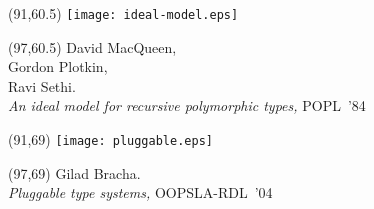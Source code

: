 \documentclass[a0]{a0poster}
\def\FONTSIZE#1{\fontsize{#1}{#1}\selectfont}
\def\CITE{\FONTSIZE{30}}
\begin{document}
\begin{textblock}{20}(91,60.5)
\texttt{[image: ideal-model.eps]}
\end{textblock}
\begin{textblock}{14}(97,60.5)
\CITE
David MacQueen,\\
Gordon Plotkin,\\
Ravi Sethi.\\
\emph{An ideal model for recursive polymorphic types,} POPL~'84
\end{textblock}

\begin{textblock}{20}(91,69)
\texttt{[image: pluggable.eps]}
\end{textblock}
\begin{textblock}{14}(97,69)
\CITE
Gilad Bracha.\\
\emph{Pluggable type systems,} OOPSLA-RDL~'04
\end{textblock}
\end{document}
